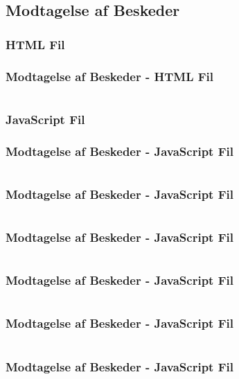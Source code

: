 \subsection{Modtagelse af Beskeder}
\subsubsection{HTML Fil}
\begin{frame}
    \frametitle{Modtagelse af Beskeder - HTML Fil}
    \vspace{-1mm}
    \inputminted[fontsize=\footnotesize,breaklines=true,highlightlines={11}]{html}{../src/frontend/part4_recv/index.html}
\end{frame}
\subsubsection{JavaScript Fil}
\begin{frame}
    \frametitle{Modtagelse af Beskeder - JavaScript Fil}
    \vspace{-1mm}
    \inputminted[fontsize=\footnotesize,highlightlines={}]{javascript}{../src/frontend/part4_recv/logic.js}
\end{frame}
\begin{frame}
    \frametitle{Modtagelse af Beskeder - JavaScript Fil}
    \vspace{-1mm}
    \inputminted[fontsize=\footnotesize,highlightlines={1}]{javascript}{../src/frontend/part4_recv/logic.js}
\end{frame}
\begin{frame}
    \frametitle{Modtagelse af Beskeder - JavaScript Fil}
    \vspace{-1mm}
    \inputminted[fontsize=\footnotesize,highlightlines={2}]{javascript}{../src/frontend/part4_recv/logic.js}
\end{frame}
\begin{frame}
    \frametitle{Modtagelse af Beskeder - JavaScript Fil}
    \vspace{-1mm}
    \inputminted[fontsize=\footnotesize,highlightlines={5}]{javascript}{../src/frontend/part4_recv/logic.js}
\end{frame}
\begin{frame}
    \frametitle{Modtagelse af Beskeder - JavaScript Fil}
    \vspace{-1mm}
    \inputminted[fontsize=\footnotesize,highlightlines={6,13}]{javascript}{../src/frontend/part4_recv/logic.js}
\end{frame}
\begin{frame}
    \frametitle{Modtagelse af Beskeder - JavaScript Fil}
    \vspace{-1mm}
    \inputminted[fontsize=\footnotesize,highlightlines={7,9}]{javascript}{../src/frontend/part4_recv/logic.js}
\end{frame}

